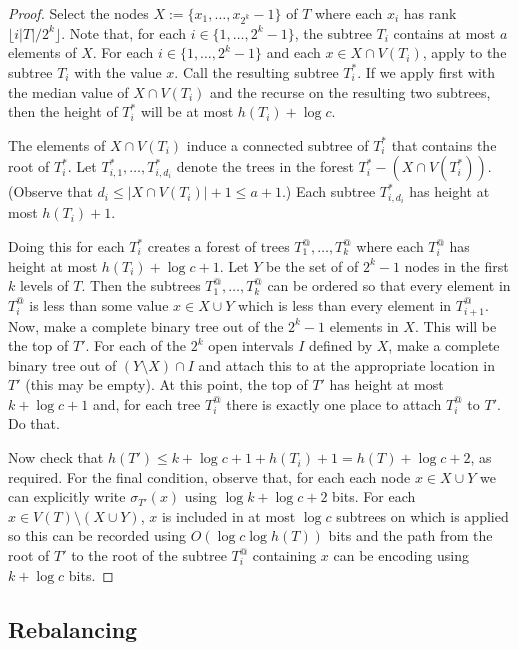 \documentclass[kpfonts]{patmorin}
\begin{document}
\begin{proof}
  Select the nodes $X:=\{x_1,\ldots,x_{2^k}-1\}$ of $T$ where each $x_i$ has rank $\lfloor i|T|/2^k\rfloor$.  Note that, for each $i\in\{1,\ldots,2^k-1\}$, the subtree $T_i$ contains at most $a$ elements of $X$.  For each $i\in\{1,\ldots,2^k-1\}$ and each $x\in X\cap V(T_i)$, apply  to the subtree $T_i$ with the value $x$. Call the resulting subtree $T_i^*$.  If we apply  first with the median value of $X\cap V(T_i)$ and the recurse on the resulting two subtrees, then the height of $T_i^*$ will be at most $h(T_i)+\log c$.  
  
  The elements of $X\cap V(T_i)$ induce a connected subtree of $T_i^*$ that contains the root of $T_i^*$.  Let $T_{i,1}^*,\ldots,T_{i,d_i}^*$ denote the trees in the forest $T_i^*-(X\cap V(T^*_i))$.  (Observe that $d_i\le |X\cap V(T_i)|+1\le a+1$.)  Each subtree $T_{i,d_i}^*$ has height at most $h(T_i)+1$.
  
  Doing this for each $T_i^*$ creates a forest of trees $T^@_1,\ldots,T^@_k$ where each $T_i^@$ has height at most $h(T_i)+\log c +1$.  Let $Y$ be the set of of $2^k-1$ nodes in the first $k$ levels of $T$.  Then the subtrees $T^@_1,\ldots,T^@_k$ can be ordered so that every element in $T^@_i$ is less than some value $x\in X\cup Y$ which is less than every element in $T^@_{i+1}$.  Now, make a complete binary tree out of the $2^k-1$ elements in $X$.  This will be the top of $T'$.  For each of the $2^{k}$ open intervals $I$ defined by $X$, make a complete binary tree out of $(Y\setminus X)\cap I$ and attach this to at the appropriate location in $T'$ (this may be empty).  At this point, the top of $T'$ has height at most $k+\log c+1$ and, for each tree $T_i^@$ there is exactly one place to attach $T^@_i$ to $T'$.  Do that.
  
  
  Now check that $h(T')\le k+\log c + 1+ h(T_i) +1 = h(T)+\log c+2$, as required.  For the final condition, observe that, for each each node $x\in X\cup Y$ we can explicitly write $\sigma_{T'}(x)$ using $\log k+\log c+2$ bits.  For each $x\in V(T)\setminus(X\cup Y)$, $x$ is included in at most $\log c$ subtrees on which  is applied so this can be recorded using $O(\log c\log h(T))$ bits and the path from the root of $T'$ to the root of the subtree $T^@_i$ containing $x$ can be encoding using $k+\log c$ bits.
\end{proof}

\subsection{Rebalancing}
\end{document}
